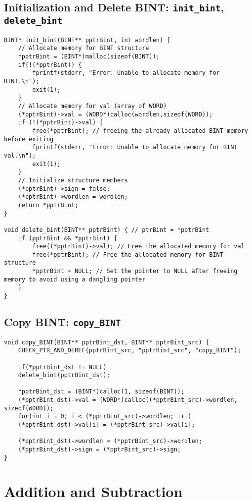\documentclass[12pt,openany]{book}
\theoremstyle{definition}
\begin{document}
	\section{Initialization and Delete BINT: \texttt{init\_bint}, \texttt{delete\_bint}}
	\begin{lstlisting}[style=C, caption={},captionpos=t]
BINT* init_bint(BINT** pptrBint, int wordlen) {
	// Allocate memory for BINT structure
	*pptrBint = (BINT*)malloc(sizeof(BINT));
	if(!(*pptrBint)) {
		fprintf(stderr, "Error: Unable to allocate memory for BINT.\n");
		exit(1);
	}
	// Allocate memory for val (array of WORD)
	(*pptrBint)->val = (WORD*)calloc(wordlen,sizeof(WORD));
	if (!(*pptrBint)->val) {
		free(*pptrBint); // freeing the already allocated BINT memory before exiting
		fprintf(stderr, "Error: Unable to allocate memory for BINT val.\n");
		exit(1);
	}
	// Initialize structure members
	(*pptrBint)->sign = false;
	(*pptrBint)->wordlen = wordlen;
	return *pptrBint;
}

void delete_bint(BINT** pptrBint) { // ptrBint = *pptrBint
	if (pptrBint && *pptrBint) {
		free((*pptrBint)->val); // Free the allocated memory for val
		free(*pptrBint); // Free the allocated memory for BINT structure
		*pptrBint = NULL; // Set the pointer to NULL after freeing memory to avoid using a dangling pointer
	}
}
	\end{lstlisting}
	\newpage
	\section{Copy BINT: \texttt{copy\_BINT}}
	\begin{lstlisting}[style=C, caption={},captionpos=t]
void copy_BINT(BINT** pptrBint_dst, BINT** pptrBint_src) {
	CHECK_PTR_AND_DEREF(pptrBint_src, "pptrBint_src", "copy_BINT");
	
	if(*pptrBint_dst != NULL)
	delete_bint(pptrBint_dst);
	
	*pptrBint_dst = (BINT*)calloc(1, sizeof(BINT));
	(*pptrBint_dst)->val = (WORD*)calloc((*pptrBint_src)->wordlen, sizeof(WORD));
	for(int i = 0; i < (*pptrBint_src)->wordlen; i++)
	(*pptrBint_dst)->val[i] = (*pptrBint_src)->val[i];
	
	(*pptrBint_dst)->wordlen = (*pptrBint_src)->wordlen;
	(*pptrBint_dst)->sign = (*pptrBint_src)->sign;
}
	\end{lstlisting}
	\newpage
	\chapter{Addition and Subtraction}
\end{document}
